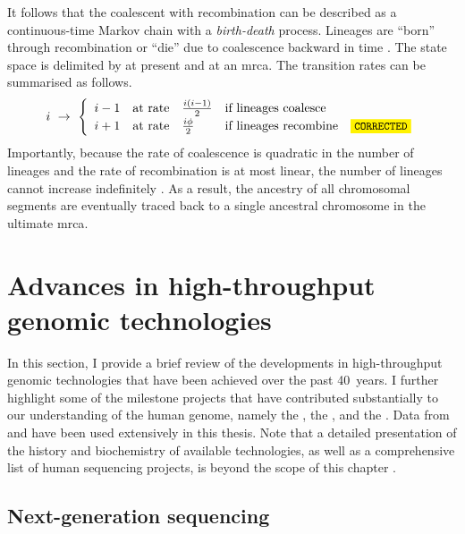 It follows that the coalescent with recombination can be described as a continuous-time Markov chain with a \emph{birth-death} process.
Lineages are ``born'' through recombination or ``die'' due to coalescence backward in time \citep[\eg, see][]{tavare2004,wakeley2008}.
The state space is delimited by  at present and  at an \gls{mrca}.
The transition rates can be summarised as follows.
\begin{equation}
i ~\rightarrow~
\renewcommand{\arraystretch}{1.2}
\left\{
\begin{array}{llll}
	i-1  &  \text{at rate} & \frac{i(i-1)}{2} & \text{if lineages coalesce} \\
  i+1  &  \text{at rate} & \frac{i\phi}{2}  & \text{if lineages recombine} \CorrectLabel
\end{array}
\right.
\end{equation}
Importantly, because the rate of coalescence is quadratic in the number of lineages and the rate of recombination is at most linear, the number of lineages cannot increase indefinitely \citep{Wiuf:1997wf}.
As a result, the ancestry of all chromosomal segments are eventually traced back to a single ancestral chromosome in the ultimate \gls{mrca}.




%
\section{Advances in high-throughput genomic technologies}
\label{sec:technology}
%

In this section, I provide a brief review of the developments in high-throughput genomic technologies that have been achieved over the past 40~years.
I further highlight some of the milestone projects that have contributed substantially to our understanding of the human genome, namely the , the , and the .
Data from  and  have been used extensively in this thesis.
Note that a detailed presentation of the history and biochemistry of available technologies, as well as a comprehensive list of human sequencing projects, is beyond the scope of this chapter \citep[for review, \eg see][]{Metzker:2009ew,Naidoo:2011ip,Liu:2012hw,Mardis:2017cq}.


%
\subsection{Next-generation sequencing}
%

